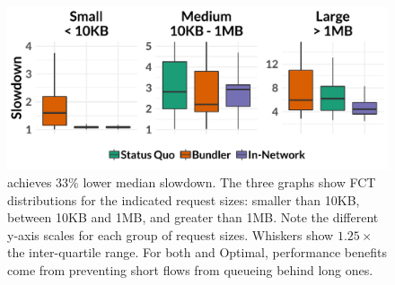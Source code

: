 \begin{figure}
    \centering
\begin{knitrout}
\color{fgcolor}
\includegraphics[width=\maxwidth]{figure/eval:best-1} 

\end{knitrout}
    \caption{\name achieves 33\% lower median slowdown. The three graphs show FCT distributions for the indicated request sizes: smaller than 10KB, between 10KB and 1MB, and greater than 1MB.  Note the different y-axis scales for each group of request sizes. Whiskers show $1.25 \times$ the inter-quartile range. For both \name and Optimal, performance benefits come from preventing short flows from queueing behind long ones.}
    \label{fig:eval:best}
\end{figure}
\newcommand{\overviewBenefitsBaselineMedian}{1.62\xspace}
\newcommand{\overviewBenefitsBaselineTail}{10.77\xspace}
\newcommand{\overviewBenefitsBundlerMedian}{1.08\xspace}
\newcommand{\overviewBenefitsBundlerTail}{9.84\xspace}
\newcommand{\overviewBenefitsOptimalMedian}{1.08\xspace}
\newcommand{\overviewBenefitsOptimalTail}{4.46\xspace}
\newcommand{\overviewBenefitsBundlerMedianImprovement}{33\%\xspace}
